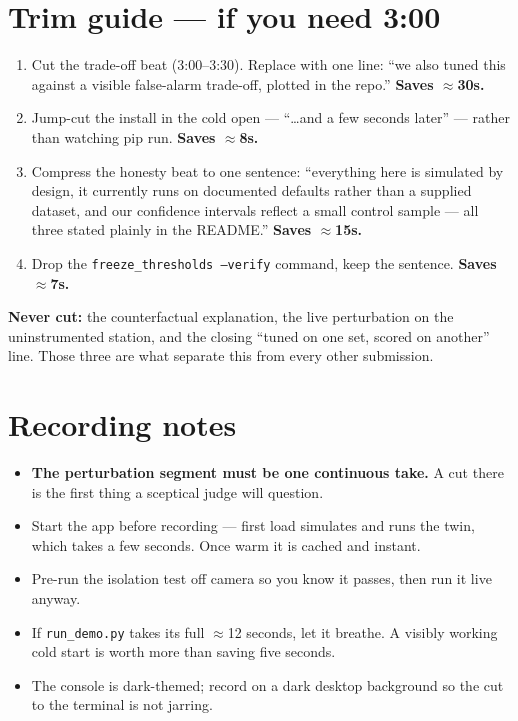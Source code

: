 \documentclass[11pt,a4paper]{article}
\begin{document}
\vspace{10pt}
\section*{Trim guide — if you need 3:00}
\begin{enumerate}[leftmargin=16pt,itemsep=3pt]
  \item Cut the trade-off beat (3:00--3:30). Replace with one line: ``we also
  tuned this against a visible false-alarm trade-off, plotted in the repo.''
  \textbf{Saves $\approx$30s.}
  \item Jump-cut the install in the cold open --- ``\ldots and a few seconds
  later'' --- rather than watching pip run. \textbf{Saves $\approx$8s.}
  \item Compress the honesty beat to one sentence: ``everything here is simulated
  by design, it currently runs on documented defaults rather than a supplied
  dataset, and our confidence intervals reflect a small control sample --- all
  three stated plainly in the README.'' \textbf{Saves $\approx$15s.}
  \item Drop the \texttt{freeze\_thresholds --verify} command, keep the sentence.
  \textbf{Saves $\approx$7s.}
\end{enumerate}

\vspace{4pt}
\noindent\textbf{Never cut:} the counterfactual explanation, the live perturbation
on the uninstrumented station, and the closing ``tuned on one set, scored on
another'' line. Those three are what separate this from every other submission.

\section*{Recording notes}
\begin{itemize}[leftmargin=16pt,itemsep=3pt]
  \item \textbf{The perturbation segment must be one continuous take.} A cut
  there is the first thing a sceptical judge will question.
  \item Start the app before recording --- first load simulates and runs the twin,
  which takes a few seconds. Once warm it is cached and instant.
  \item Pre-run the isolation test off camera so you know it passes, then run it
  live anyway.
  \item If \texttt{run\_demo.py} takes its full $\approx$12 seconds, let it
  breathe. A visibly working cold start is worth more than saving five seconds.
  \item The console is dark-themed; record on a dark desktop background so the
  cut to the terminal is not jarring.
\end{itemize}
\end{document}

